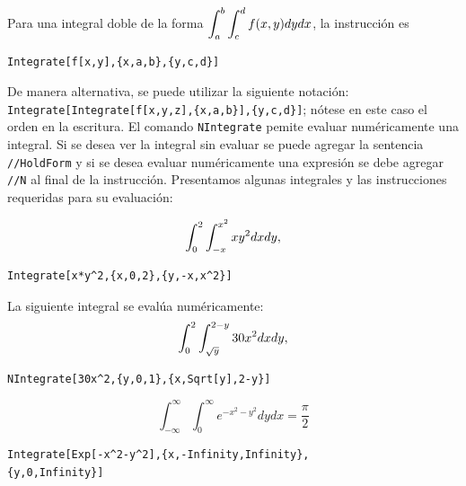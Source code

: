 Para una integral doble de la forma
$\displaystyle \int_a^b \int_c^d f(x,y)dydx$, la instrucción es
\begin{tcolorbox}[title=Integrales dobles]
\begin{Verbatim}[formatcom=\letraverbatim]
Integrate[f[x,y],{x,a,b},{y,c,d}]
\end{Verbatim}
\end{tcolorbox}
De manera alternativa, se puede utilizar la siguiente notación:\\
\verb"Integrate[Integrate[f[x,y,z],{x,a,b}],{y,c,d}]"; nótese en este caso el orden en la escritura.
El comando \verb"NIntegrate" pemite evaluar numéricamente una integral. 
Si se desea ver la integral sin evaluar se puede
agregar la sentencia \verb"//HoldForm" y si se desea evaluar numéricamente una expresión se debe agregar
\verb"//N" al final de la instrucción. Presentamos algunas integrales y las instrucciones requeridas para su evaluación:
\begin{parrafonumerado}
\item %
\[\displaystyle\int_0^2 \int_{-x}^{x^2} xy^2 dxdy,\] %
\begin{tcolorbox}
\begin{Verbatim}[formatcom=\letraverbatim]
Integrate[x*y^2,{x,0,2},{y,-x,x^2}]
\end{Verbatim}
\end{tcolorbox}
\item La siguiente integral se evalúa numéricamente:
\[\displaystyle \int_0^2 \int_{\sqrt{y}}^{2-y} 30x^2 dxdy,\] %
\begin{tcolorbox}
\begin{Verbatim}[formatcom=\letraverbatim]
NIntegrate[30x^2,{y,0,1},{x,Sqrt[y],2-y}]
\end{Verbatim}
\end{tcolorbox}
\item %
\[\int_{-\infty}^{\infty}\int_{0}^{\infty }e^{-x^{2}-y^{2}}dydx= \frac{\pi}{2} \] %
\begin{tcolorbox}
\begin{Verbatim}[formatcom=\letraverbatim]
Integrate[Exp[-x^2-y^2],{x,-Infinity,Infinity},
{y,0,Infinity}]
\end{Verbatim}
\end{tcolorbox}
\end{parrafonumerado}

